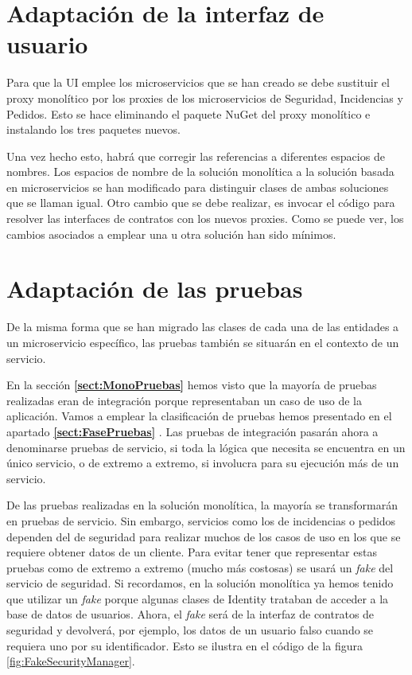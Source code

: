 \documentclass[11pt,spanish,listoffigures]{tfgetsinf}
\begin{document}
\newpage

\section{Adaptación de la interfaz de usuario}

Para que la UI emplee los microservicios que se han creado se debe sustituir el proxy monolítico por los proxies de los microservicios de Seguridad, Incidencias y Pedidos. Esto se hace eliminando el paquete NuGet del proxy monolítico e instalando los tres paquetes nuevos.

Una vez hecho esto, habrá que corregir las referencias a diferentes espacios de nombres. Los espacios de nombre de la solución monolítica a la solución basada en microservicios se han modificado para distinguir clases de ambas soluciones que se llaman igual. Otro cambio que se debe realizar, es invocar el código para resolver las interfaces de contratos con los nuevos proxies. Como se puede ver, los cambios asociados a emplear una u otra solución han sido mínimos.

\section{Adaptación de las pruebas}

De la misma forma que se han migrado las clases de cada una de las entidades a un microservicio específico, las pruebas también se situarán en el contexto de un servicio.

En la sección \textbf{\ref{sect:MonoPruebas} } hemos visto que la mayoría de pruebas realizadas eran de integración porque representaban un caso de uso de la aplicación. Vamos a emplear la clasificación de pruebas hemos presentado en el apartado \textbf{\ref{sect:FasePruebas} }. Las pruebas de integración pasarán ahora a denominarse pruebas de servicio, si toda la lógica que necesita se encuentra en un único servicio, o de extremo a extremo, si involucra para su ejecución más de un servicio.

De las pruebas realizadas en la solución monolítica, la mayoría se transformarán en pruebas de servicio. Sin embargo, servicios como los de incidencias o pedidos dependen del de seguridad para realizar muchos de los casos de uso en los que se requiere obtener datos de un cliente. Para evitar tener que representar estas pruebas como de extremo a extremo (mucho más costosas) se usará un \textit{fake} del servicio de seguridad. Si recordamos, en la solución monolítica ya hemos tenido que utilizar un \textit{fake} porque algunas clases de Identity trataban de acceder a la base de datos de usuarios. Ahora, el \textit{fake} será de la interfaz de contratos de seguridad y devolverá, por ejemplo, los datos de un usuario falso cuando se requiera uno por su identificador. Esto se ilustra en el código de la figura \ref{fig:FakeSecurityManager}.
\end{document}
